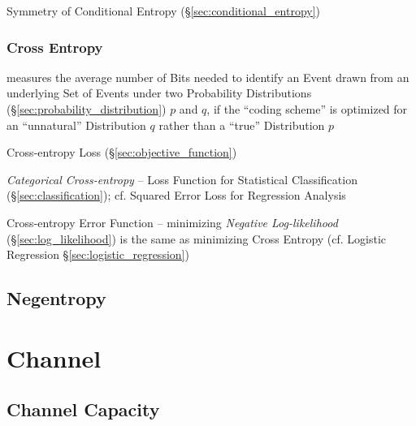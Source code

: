 Symmetry of Conditional Entropy (\S\ref{sec:conditional_entropy})



\subsubsection{Cross Entropy}\label{sec:cross_entropy}

measures the average number of Bits needed to identify an Event drawn from an
underlying Set of Events under two Probability Distributions
(\S\ref{sec:probability_distribution}) $p$ and $q$, if the ``coding scheme'' is
optimized for an ``unnatural'' Distribution $q$ rather than a ``true''
Distribution $p$

Cross-entropy Loss (\S\ref{sec:objective_function})

\emph{Categorical Cross-entropy} -- Loss Function for Statistical Classification
(\S\ref{sec:classification}); cf. Squared Error Loss for Regression Analysis

\fist Cross-entropy Error Function -- minimizing \emph{Negative Log-likelihood}
(\S\ref{sec:log_likelihood}) is the same as minimizing Cross Entropy (cf.
Logistic Regression \S\ref{sec:logistic_regression})



\subsection{Negentropy}\label{sec:negentropy}



\section{Channel}\label{sec:channel}

\subsection{Channel Capacity}\label{sec:channel_capacity}

